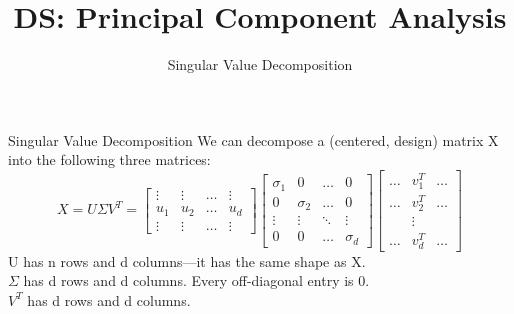 \documentclass[aspectratio=169]{../latex_main/tntbeamer}  %
\title[Introduction]{DS: Principal Component Analysis}
\subtitle{Singular Value Decomposition}
\begin{document}
	
	\maketitle
	\begin{frame}{Singular Value Decomposition}
	    We can decompose a (centered, design) matrix X into the following three matrices:
	    \begin{equation*}
	        X = U\Sigma V^T = \left[\begin{array}{cccc}
	        \vdots & \vdots & \dots &\vdots \\
	       u_1 & u_2 & \dots & u_d \\
	              \vdots &     \vdots   &   \dots  &  \vdots 
	    \end{array}\right]
	    \left[\begin{array}{cccc}
	        \sigma_1 & 0 & \dots & 0 \\
	        0 & \sigma_2 & \dots & 0 \\
	              \vdots &     \vdots   &   \ddots  &  \vdots  \\
	       0 & 0 & \dots &\sigma_d
	    \end{array}\right]
	    \left[\begin{array}{ccc}
	       \dots & v^T_1 & \dots  \\
	       \dots & v^T_2 & \dots  \\
	        &     \vdots   &  \\
	       \dots & v^T_d & \dots  
	    \end{array}\right]
	    \end{equation*}
	    U has n rows and d columns—it has the same shape as X.\\
	    $\Sigma$ has d rows and d columns. Every off-diagonal entry is 0.\\
	    $V^T$ has d rows and d columns.
	    
	\end{frame}
	
\end{document}
